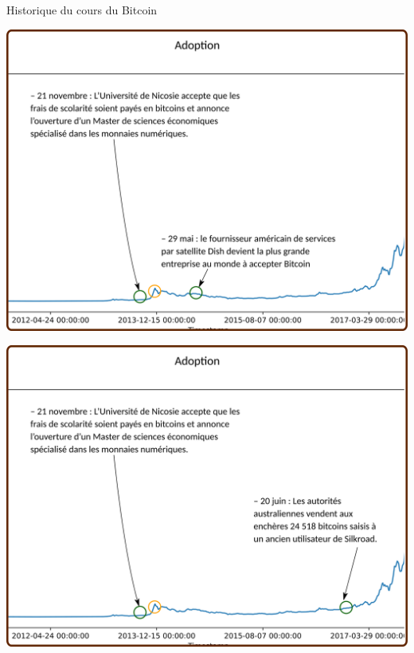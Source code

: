 \documentclass[presentation]{beamer}
\begin{document}
\begin{frame}[label={sec:org6ff9387}]{Historique du cours du Bitcoin}
\begin{block}{}
\begin{center}
\includegraphics[width=.95\textwidth]{./Pictures/Timeline/24adoption_network.png}
\end{center}
\end{block}

\begin{block}{}
\begin{center}
\includegraphics[width=.95\textwidth]{./Pictures/Timeline/25adoption_enchere.png}
\end{center}
\end{block}


\end{frame}
\end{document}
